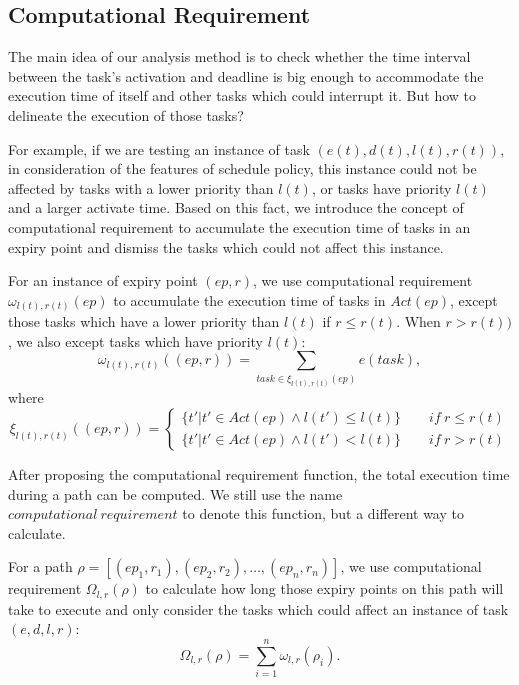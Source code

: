 \documentclass[sigconf]{acmart}
\begin{document}
\subsection{Computational Requirement}
The main idea of our analysis method is to check whether the time interval between the task's activation and deadline is big enough to accommodate the execution time of itself and other tasks which could interrupt it. But how to delineate the execution of those tasks?

For example, if we are testing an instance of task $(e(t),d(t),l(t),r(t))$, in consideration of the features of schedule policy, this instance could not be affected by tasks with a lower priority than $l(t)$, or tasks have priority $l(t)$ and a larger activate time. Based on this fact, we introduce the concept of computational requirement to accumulate the execution time of tasks in an expiry point and dismiss the tasks which could not affect this instance.
\begin{definition}
For an instance of expiry point $(ep,r)$, we use computational requirement $\omega_{l(t),r(t)}(ep)$ to accumulate the execution time of tasks in $Act(ep)$, except those tasks which have a lower priority than $l(t)$ if $r\leq r(t)$. When $r>r(t))$, we also except tasks which have priority $l(t)$:
\begin{equation}
\omega_{l(t),r(t)}((ep,r))=\sum\limits_{task\in \xi_{l(t),r(t)}(ep)}e(task),
\end{equation}\label{equation_loweromega}
where 
\[
\xi_{l(t),r(t)}((ep,r))=\begin{cases}\{t'|t'\in Act(ep)\wedge l(t')\leq l(t)\}\qquad if\ r\leq r(t)\\
\{t'|t'\in Act(ep)\wedge l(t')<l(t)\}\qquad if\ r>r(t)
\end{cases}\]
\end{definition}
After proposing the computational requirement function, the total execution time during a path can be computed. We still use the name $computational\ requirement$ to denote this function, but a different way to calculate.
\begin{definition}
For a path $\rho=[(ep_1,r_1),(ep_2,r_2),\dots,(ep_n,r_n)]$, we use computational requirement $\Omega_{l,r}(\rho)$ to calculate how long those expiry points on this path will take to execute and only consider the tasks which could affect an instance of task $(e,d,l,r)$:
\begin{equation}
\Omega_{l,r}(\rho)=\sum_{i=1}^n\omega_{l,r}(\rho_i).
\end{equation}\label{equation_higheromega}
\end{definition}
\end{document}
